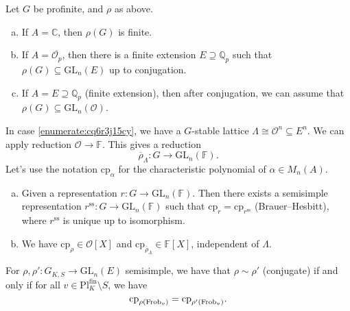 \documentclass[reqno]{amsart} 
\begin{document}
\begin{exercise}
  Let $G$ be profinite, and $\rho$ as above.
  \begin{enumerate}[(a)]
  \item If $A = \mathbb{C}$, then $\rho(G)$ is finite.
  \item If $A = \overline{\mathcal{O}_p}$, then there is a finite extension $E \supseteq \mathbb{Q}_p$ such that $\rho(G) \subseteq \mathrm{GL}_n(E)$ up to conjugation.
  \item\label{enumerate:cq6r3j15cy} If $A = E \supseteq \mathbb{Q}_p$ (finite extension), then after conjugation, we can assume that $\rho(G) \subseteq \mathrm{GL}_n(\mathcal{O})$.
  \end{enumerate}
\end{exercise}
In case \eqref{enumerate:cq6r3j15cy}, we have a $G$-stable lattice $\Lambda \cong \mathcal{O}^n \subseteq E^n$.  We can apply reduction $\mathcal{O} \rightarrow \mathbb{F}$.  This gives a reduction
\begin{equation*}
  \overline{\rho}_\Lambda : G \rightarrow \mathrm{GL}_n(\mathbb{F}).
\end{equation*}
Let's use the notation $\mathrm{c p}_\alpha$ for the characteristic polynomial of $\alpha \in M_n(A)$.
\begin{theorem}
  \begin{enumerate}[(a)]
  \item Given a representation $r : G \rightarrow \mathrm{GL}_n(\mathbb{F})$.  Then there exists a semisimple representation $r^{\mathrm{ss}} : G \rightarrow \mathrm{GL}_n(\mathbb{F})$ such that $\mathrm{c p}_r = \mathrm{c p}_{r^{\mathrm{ss}}}$ (Brauer--Hesbitt), where $r^{\mathrm{ss}}$ is unique up to isomorphism.
  \item We have $\mathrm{c p}_{\rho} \in \mathcal{O}[X]$ and $\mathrm{c p}_{\bar{\rho}_\Lambda} \in \mathbb{F}[X]$, independent of $\Lambda$.
  \end{enumerate}
\end{theorem}
\begin{theorem}
  For $\rho, \rho ' : G_{K, S} \rightarrow \mathrm{GL}_n(E)$ semisimple, we have that $\rho \sim \rho '$ (conjugate) if and only if  for all $v \in \mathrm{P l}_K^{\mathrm{fin}} \setminus S$, we have
  \begin{equation*}
    \mathrm{c p}_{\rho(\operatorname{Frob}_v)} = \mathrm{c p}_{\rho '(\operatorname{Frob}_v)}.
  \end{equation*}
\end{theorem}
\end{document}
